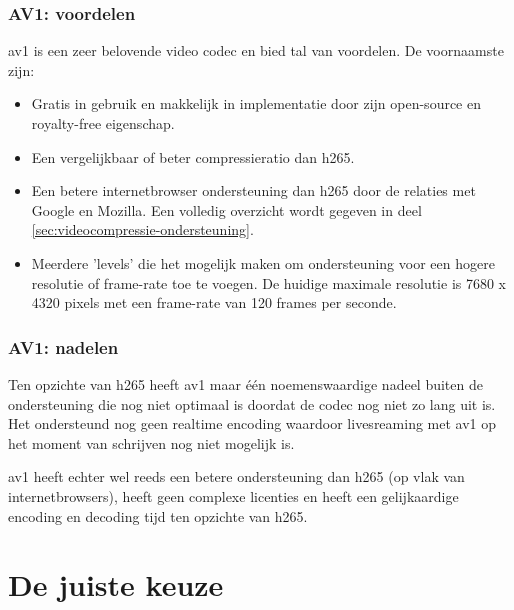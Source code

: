 \subsubsection{AV1: voordelen}
\label{sec:videocompressie-av1-voordelen}

\Gls{av1} is een zeer belovende video \gls{codec} en bied tal van voordelen. De voornaamste zijn:

\begin{itemize}
	
	\item Gratis in gebruik en makkelijk in implementatie door zijn \gls{open-source} en royalty-free eigenschap.
	
	\item Een vergelijkbaar of beter \gls{compressieratio} dan \gls{h265}.
	
	\item Een betere internetbrowser ondersteuning dan \gls{h265} door de relaties met Google en Mozilla. Een volledig overzicht wordt gegeven in deel \ref{sec:videocompressie-ondersteuning}.
	
	\item Meerdere 'levels' die het mogelijk maken om ondersteuning voor een hogere resolutie of \gls{frame-rate} toe te voegen. De huidige maximale resolutie is 7680 x 4320 \glspl{pixel} met een \gls{frame-rate} van 120 \glspl{frame} per seconde.
	
\end{itemize}

\subsubsection{AV1: nadelen}
\label{sec:videocompressie-av1-nadelen}

Ten opzichte van \gls{h265} heeft \gls{av1} maar één noemenswaardige nadeel buiten de ondersteuning die nog niet optimaal is doordat de \gls{codec} nog niet zo lang uit is. Het ondersteund nog geen realtime \gls{encoding} waardoor livesreaming met \gls{av1} op het moment van schrijven nog niet mogelijk is.

\Gls{av1} heeft echter wel reeds een betere ondersteuning dan \gls{h265} (op vlak van internetbrowsers), heeft geen complexe licenties en heeft een gelijkaardige \gls{encoding} en \gls{decoding} tijd ten opzichte van \gls{h265}.  

\section{De juiste keuze}
\label{sec:videocompressie-keuze}

